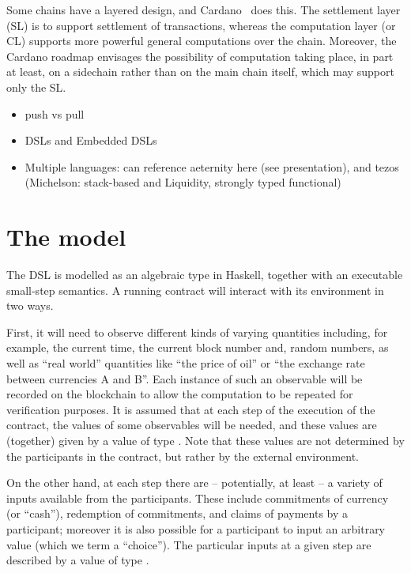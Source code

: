 \documentclass[
      acmsmall
    , screen
    , review=true
  ]{acmart}
\begin{document}
Some chains have a layered design, and Cardano~\cite{cardano} does this. The settlement layer (SL) is to support settlement of transactions, whereas the computation layer (or CL) supports more powerful general computations over the chain. Moreover, the Cardano roadmap \cite{cardano-rationale} envisages the possibility of computation taking place, in part at least, on a sidechain  rather than on the main chain itself, which may support only the SL.

\medskip
\noindent
{}
\begin{itemize}
\item
push vs pull
\item
DSLs and Embedded DSLs
\item
Multiple languages: can reference aeternity here (see presentation), and tezos (Michelson: stack-based and Liquidity, strongly typed functional)
\end{itemize}

\section{The model}
The DSL is modelled as an algebraic type in Haskell, together with an executable small-step semantics. 
A running contract will interact with its environment in two ways.

First, it will need to observe different kinds of varying quantities including, for example, the current time, the current block number and, random numbers, as well as ``real world'' quantities like ``the price of oil'' or ``the exchange rate between currencies A and B''. Each instance of such an observable will be recorded on the blockchain to allow the computation to be repeated for verification purposes. It is assumed that at each step of the execution of the contract, the values of some observables will be needed, and these values are (together) given by a value of type . Note that these values are not determined by the participants in the contract, but rather by the external environment.

On the other hand, at each step there are -- potentially, at least -- a variety of inputs available from the participants. These include commitments of currency (or ``cash''), redemption of commitments, and claims of payments by a participant; moreover it is also possible for a participant to input an arbitrary value (which we term a ``choice''). The particular inputs at a given step are described by a value of type .
\end{document}
